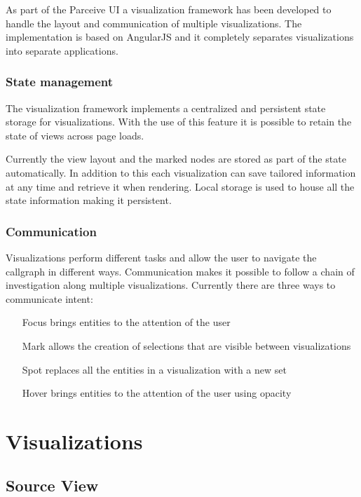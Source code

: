 \documentclass[conference]{IEEEtran}
\begin{document}
As part of the Parceive UI a visualization framework has been developed to handle the layout and communication of multiple visualizations. The implementation is based on AngularJS and it completely separates visualizations into separate applications.

\subsubsection{State management}

The visualization framework implements a centralized and persistent state storage for visualizations. With the use of this feature it is possible to retain the state of views across page loads.

Currently the view layout and the marked nodes are stored as part of the state automatically. In addition to this each visualization can save tailored information at any time and retrieve it when rendering. Local storage is used to house all the state information making it persistent.

\subsubsection{Communication}

Visualizations perform different tasks and allow the user to navigate the callgraph in different ways. Communication makes it possible to follow a chain of investigation along multiple visualizations. Currently there are three ways to communicate intent:

\begin{itemize}
	\item[Focus] brings entities to the attention of the user
	\item[Mark] allows the creation of selections that are visible between visualizations
	\item[Spot] replaces all the entities in a visualization with a new set
	\item[Hover] brings entities to the attention of the user using opacity
\end{itemize}


\section{Visualizations}

\subsection{Source View}
\end{document}

